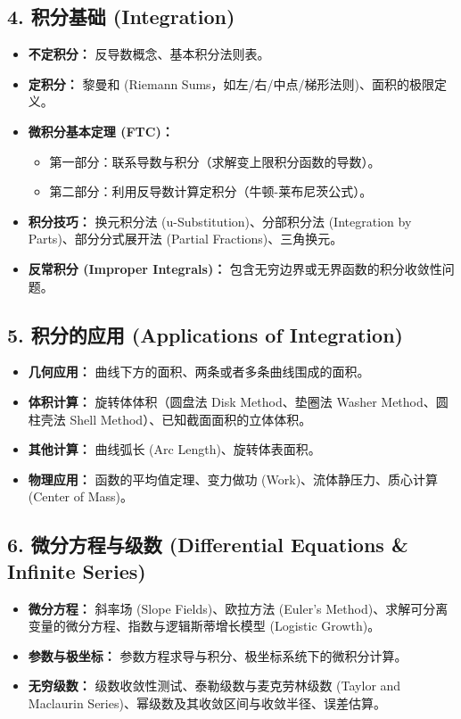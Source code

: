 \documentclass[12pt,a4paper]{article}
\begin{document}
\subsection*{4. 积分基础 (Integration)}
\begin{itemize}
    \item \textbf{不定积分：} 反导数概念、基本积分法则表。
    \item \textbf{定积分：} 黎曼和 (Riemann Sums，如左/右/中点/梯形法则)、面积的极限定义。
    \item \textbf{微积分基本定理 (FTC)：}
    \begin{itemize}
        \item 第一部分：联系导数与积分（求解变上限积分函数的导数）。
        \item 第二部分：利用反导数计算定积分（牛顿-莱布尼茨公式）。
    \end{itemize}
    \item \textbf{积分技巧：} 换元积分法 (u-Substitution)、分部积分法 (Integration by Parts)、部分分式展开法 (Partial Fractions)、三角换元。
    \item \textbf{反常积分 (Improper Integrals)：} 包含无穷边界或无界函数的积分收敛性问题。
\end{itemize}

\subsection*{5. 积分的应用 (Applications of Integration)}
\begin{itemize}
    \item \textbf{几何应用：} 曲线下方的面积、两条或者多条曲线围成的面积。
    \item \textbf{体积计算：} 旋转体体积（圆盘法 Disk Method、垫圈法 Washer Method、圆柱壳法 Shell Method）、已知截面面积的立体体积。
    \item \textbf{其他计算：} 曲线弧长 (Arc Length)、旋转体表面积。
    \item \textbf{物理应用：} 函数的平均值定理、变力做功 (Work)、流体静压力、质心计算 (Center of Mass)。
\end{itemize}

\subsection*{6. 微分方程与级数 (Differential Equations \& Infinite Series)}
\begin{itemize}
    \item \textbf{微分方程：} 斜率场 (Slope Fields)、欧拉方法 (Euler's Method)、求解可分离变量的微分方程、指数与逻辑斯蒂增长模型 (Logistic Growth)。
    \item \textbf{参数与极坐标：} 参数方程求导与积分、极坐标系统下的微积分计算。
    \item \textbf{无穷级数：} 级数收敛性测试、泰勒级数与麦克劳林级数 (Taylor and Maclaurin Series)、幂级数及其收敛区间与收敛半径、误差估算。
\end{itemize}
\end{document}
